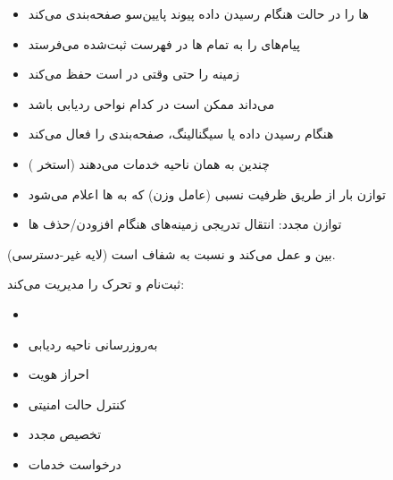 
\begin{itemize}
\tightlist
\item
  ها را در حالت  هنگام رسیدن داده پیوند پایین‌سو صفحه‌بندی می‌کند
\item
  پیام‌های  را به تمام ها در فهرست  ثبت‌شده  می‌فرستد
\end{itemize}


\begin{itemize}
\tightlist
\item
  زمینه  را حتی وقتی  در  است حفظ می‌کند
\item
  می‌داند  ممکن است در کدام نواحی ردیابی باشد
\item
  هنگام رسیدن داده یا سیگنالینگ، صفحه‌بندی را فعال می‌کند
\end{itemize}


\begin{itemize}
\tightlist
\item
  چندین  به همان ناحیه خدمات می‌دهند (استخر )
\item
  توازن بار از طریق ظرفیت نسبی (عامل وزن) که به ها اعلام می‌شود
\item
  توازن مجدد: انتقال تدریجی زمینه‌های  هنگام افزودن/\allowbreak{}حذف ها
\end{itemize}


 (لایه غیر-دسترسی) بین  و  عمل می‌کند و نسبت به  شفاف است.


ثبت‌نام و تحرک  را مدیریت می‌کند:

\begin{itemize}
\tightlist
\item
\item
  به‌روزرسانی ناحیه ردیابی 
\item
  احراز هویت 
\item
  کنترل حالت امنیتی
\item
  تخصیص مجدد 
\item
  درخواست خدمات
\end{itemize}


